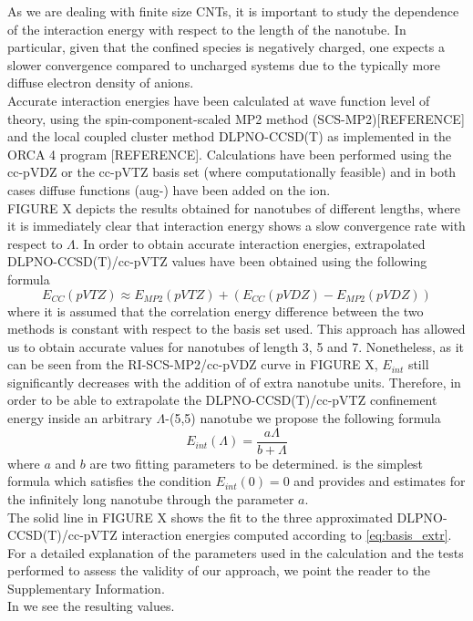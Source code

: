 \documentclass[utf8]{article}
\begin{document}
As we are dealing with finite size CNTs, it is important to study the dependence of the interaction energy with respect to the length of the nanotube. In particular, given that the confined species is negatively charged, one expects a slower convergence compared to uncharged systems due to the typically more diffuse electron density of anions.\\
Accurate interaction energies have been calculated at wave function level of theory, using the spin-component-scaled MP2 method (SCS-MP2)[REFERENCE] and the local coupled cluster method DLPNO-CCSD(T) as implemented in the ORCA 4 program [REFERENCE]. Calculations have been performed using the cc-pVDZ or the cc-pVTZ basis set (where computationally feasible) and in both cases diffuse functions (aug-) have been added on the \ntm ion.\\
FIGURE X depicts the results obtained for nanotubes of different lengths, where it is immediately clear that interaction energy shows a slow convergence rate with respect to $\Lambda$.
In order to obtain accurate interaction energies, extrapolated DLPNO-CCSD(T)/cc-pVTZ values have been obtained using the following formula
%
\begin{equation}
    E_{CC}(pVTZ) \approx E_{MP2}(pVTZ) + (E_{CC}(pVDZ) - E_{MP2}(pVDZ)) \label{eq:basis_extr}
\end{equation}
%
where it is assumed that the correlation energy difference between the two methods is constant with respect to the basis set used.
This approach has allowed us to obtain accurate values for nanotubes of length 3, 5 and 7. Nonetheless, as it can be seen from the RI-SCS-MP2/cc-pVDZ curve in FIGURE X, $E_{int}$ still significantly decreases with the addition of of extra nanotube units.
Therefore, in order to be able to extrapolate the DLPNO-CCSD(T)/cc-pVTZ confinement energy inside an arbitrary $\Lambda$-(5,5) nanotube we propose the following formula
%
\begin{equation}
    E_{int}(\Lambda) = \frac{a\Lambda}{b + \Lambda} \label{eq:length_extr}
\end{equation} 
%
where $a$ and $b$ are two fitting parameters to be determined.
 is the simplest formula which satisfies the condition $E_{int}(0) = 0$ and provides and estimates for the infinitely long nanotube through the parameter $a$.\\
The solid line in FIGURE X shows the fit to the three approximated DLPNO-CCSD(T)/cc-pVTZ interaction energies computed according to \cref{eq:basis_extr}. 
For a detailed explanation of the parameters used in the calculation and the tests performed to assess the validity of our approach, we point the reader to the Supplementary Information.\\
In  we see the resulting values.
\end{document}
